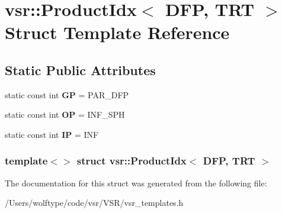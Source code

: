 \hypertarget{structvsr_1_1_product_idx_3_01_d_f_p_00_01_t_r_t_01_4}{\section{vsr\-:\-:Product\-Idx$<$ D\-F\-P, T\-R\-T $>$ Struct Template Reference}
\label{structvsr_1_1_product_idx_3_01_d_f_p_00_01_t_r_t_01_4}
}
\subsection*{Static Public Attributes}
\begin{DoxyCompactItemize}
\item 
\hypertarget{structvsr_1_1_product_idx_3_01_d_f_p_00_01_t_r_t_01_4_a1a6bf40eb8aa9100141e26388eda3163}{static const int {\bfseries G\-P} = P\-A\-R\-\_\-\-D\-F\-P}\label{structvsr_1_1_product_idx_3_01_d_f_p_00_01_t_r_t_01_4_a1a6bf40eb8aa9100141e26388eda3163}

\item 
\hypertarget{structvsr_1_1_product_idx_3_01_d_f_p_00_01_t_r_t_01_4_a9ab1902f7682e6733a5e7a5837d6bd54}{static const int {\bfseries O\-P} = I\-N\-F\-\_\-\-S\-P\-H}\label{structvsr_1_1_product_idx_3_01_d_f_p_00_01_t_r_t_01_4_a9ab1902f7682e6733a5e7a5837d6bd54}

\item 
\hypertarget{structvsr_1_1_product_idx_3_01_d_f_p_00_01_t_r_t_01_4_adc003a4ad3267f9cd1a6a3a81c6b8735}{static const int {\bfseries I\-P} = I\-N\-F}\label{structvsr_1_1_product_idx_3_01_d_f_p_00_01_t_r_t_01_4_adc003a4ad3267f9cd1a6a3a81c6b8735}

\end{DoxyCompactItemize}
\subsubsection*{template$<$$>$ struct vsr\-::\-Product\-Idx$<$ D\-F\-P, T\-R\-T $>$}



The documentation for this struct was generated from the following file\-:\begin{DoxyCompactItemize}
\item 
/\-Users/wolftype/code/vsr/\-V\-S\-R/vsr\-\_\-templates.\-h\end{DoxyCompactItemize}
